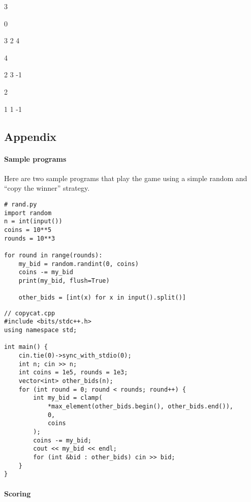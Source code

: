 \documentclass[
    a4paper,
    12pt,
    parskip=half,
    headings=standardclasses,
    footskip=0pt,
    footlines=1,
    headheight=80in
]{scrartcl}
\newcommand{\lgrey}{black!5}
\begin{document}
\begin{tcolorbox}[colback=\lgrey,fontupper=\small\ttfamily]
3

\hfill0

3 2 4

\hfill4

2 3 -1

\hfill2

1 1 -1
\end{tcolorbox}

\clearpage

\subsection*{Appendix}

\paragraph*{Sample programs}\label{sample-programs}

Here are two sample programs that play the game using a simple random and ``copy the
winner'' strategy.

\begin{verbatim}
# rand.py
import random
n = int(input())
coins = 10**5
rounds = 10**3

for round in range(rounds):
    my_bid = random.randint(0, coins)
    coins -= my_bid
    print(my_bid, flush=True)
    
    other_bids = [int(x) for x in input().split()]
\end{verbatim}

\begin{verbatim}
// copycat.cpp
#include <bits/stdc++.h>
using namespace std;

int main() {
    cin.tie(0)->sync_with_stdio(0);
    int n; cin >> n;
    int coins = 1e5, rounds = 1e3;
    vector<int> other_bids(n);
    for (int round = 0; round < rounds; round++) {
        int my_bid = clamp(
            *max_element(other_bids.begin(), other_bids.end()),
            0,
            coins
        );
        coins -= my_bid;
        cout << my_bid << endl;
        for (int &bid : other_bids) cin >> bid;
    }
}
\end{verbatim}

\paragraph*{Scoring}\label{scoring}
\end{document}
